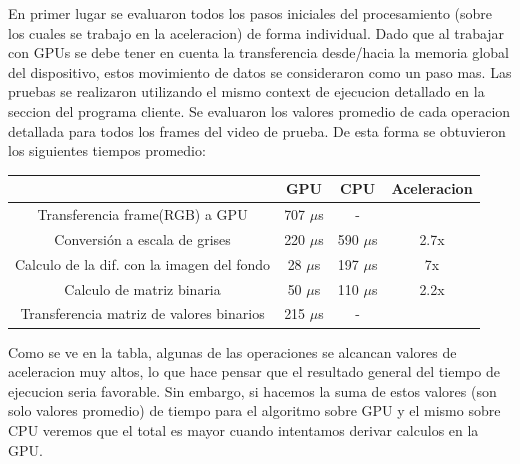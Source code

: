 \documentclass[a4paper,10pt]{report}
\begin{document}
En primer lugar se evaluaron todos los pasos iniciales del procesamiento (sobre los cuales se trabajo en la aceleracion) de forma individual.
Dado que al trabajar con GPUs se debe tener en cuenta la transferencia desde/hacia la memoria global del dispositivo, estos movimiento de datos se consideraron como un paso mas.
Las pruebas se realizaron utilizando el mismo context de ejecucion detallado en la seccion del programa cliente. Se evaluaron los valores promedio de cada operacion detallada para todos los frames del video de prueba.
De esta forma se obtuvieron los siguientes tiempos promedio:

\begin{center}
    \begin{tabular}{ c | c | c | c }
    \hline
    & GPU & CPU & Aceleracion\\ \hline
    Transferencia frame(RGB) a GPU & 707 $\mu$s &  - \\ \hline
    Conversión a escala de grises & 220 $\mu$s & 590 $\mu$s & 2.7x \\ \hline
    Calculo de la dif. con la imagen del fondo & 28 $\mu$s & 197 $\mu$s & 7x\\ \hline
    Calculo de matriz binaria & 50 $\mu$s & 110 $\mu$s & 2.2x\\ \hline
    Transferencia matriz de valores binarios & 215 $\mu$s & -  \\ \hline
    \end{tabular}
\end{center}


Como se ve en la tabla, algunas de las operaciones se alcancan valores de aceleracion muy altos, lo que hace pensar que el resultado general del tiempo de ejecucion seria favorable.
Sin embargo, si hacemos la suma de estos valores (son solo valores promedio) de tiempo para el algoritmo sobre GPU y el mismo sobre CPU veremos que el total es mayor cuando intentamos derivar calculos en la GPU.
\end{document}
